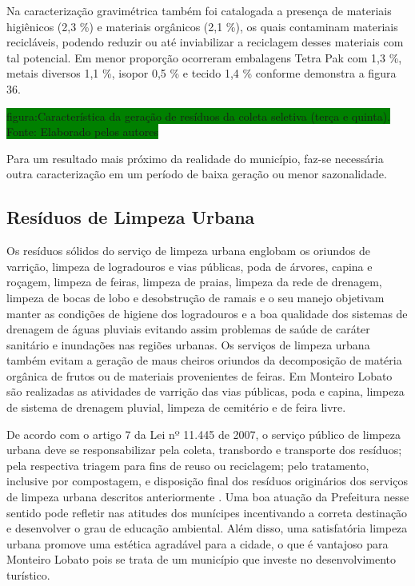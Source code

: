 	Na caracterização gravimétrica também foi catalogada a presença de materiais higiênicos (2,3 \%) e materiais orgânicos (2,1 \%), os quais contaminam materiais recicláveis, podendo reduzir ou até inviabilizar a reciclagem desses materiais com tal potencial. Em menor proporção ocorreram embalagens Tetra Pak com 1,3 \%, metais diversos 1,1 \%, isopor 0,5 \% e tecido 1,4 \% conforme demonstra a figura 36.
	
	\colorbox{green}{figura:Característica da geração de resíduos da coleta seletiva (terça e quinta). Fonte: Elaborado pelos autores}
	
	Para um resultado mais próximo da realidade do município, faz-se necessária outra caracterização em um período de baixa geração ou menor sazonalidade.
	
	\subsection{Resíduos de Limpeza Urbana}
	
	Os resíduos sólidos do serviço de limpeza urbana englobam os oriundos de varrição, limpeza de logradouros e vias públicas, poda de árvores, capina e roçagem, limpeza de feiras, limpeza de praias, limpeza da rede de drenagem, limpeza de bocas de lobo e desobstrução de ramais \cite{brasil:12305, brasil:11445, ibam:2001} e o seu manejo objetivam manter as condições de higiene dos logradouros e a boa qualidade dos sistemas de drenagem de águas pluviais evitando assim problemas de saúde de caráter sanitário e inundações nas regiões urbanas. Os serviços de limpeza urbana também evitam a geração de maus cheiros oriundos da decomposição de matéria orgânica de frutos ou de materiais provenientes de feiras. Em Monteiro Lobato são realizadas as atividades de varrição das vias públicas, poda e capina, limpeza de sistema de drenagem pluvial, limpeza de cemitério e de feira livre.
	
	De acordo com o artigo 7 da Lei nº 11.445 de 2007, o serviço público de limpeza urbana deve se responsabilizar pela coleta, transbordo e transporte dos resíduos; pela respectiva triagem para fins de reuso ou reciclagem; pelo tratamento, inclusive por compostagem, e disposição final dos resíduos originários dos serviços de limpeza urbana descritos anteriormente \cite{brasil:11445}. Uma boa atuação da Prefeitura nesse sentido pode refletir nas atitudes dos munícipes incentivando a correta destinação e desenvolver o grau de educação ambiental. Além disso, uma satisfatória limpeza urbana promove uma estética agradável para a cidade, o que é vantajoso para Monteiro Lobato pois se trata de um município que investe no desenvolvimento turístico.
	 
